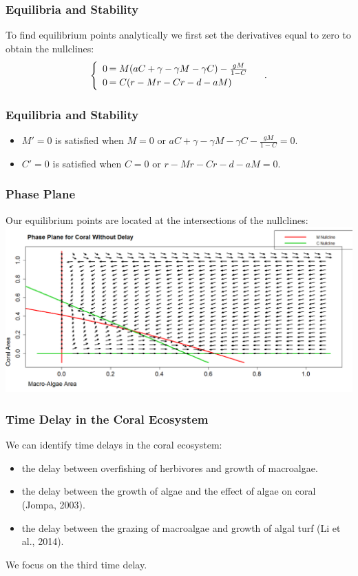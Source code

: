 \documentclass{beamer}
\begin{document}

\begin{frame}\frametitle{Equilibria and Stability}
To find equilibrium points analytically we first set the derivatives equal to zero to obtain the nullclines:
$$\begin{cases}
\begin{array}{rl}
0\hspace{-.8em}&=M(aC + \gamma-\gamma M-\gamma C) - \frac{gM}{1-C}\\
0\hspace{-.8em}&=C(r-Mr-Cr - d - aM)\\
\end{array}
\end{cases}.$$
\end{frame}

\begin{frame}\frametitle{Equilibria and Stability}\begin{itemize}
\item $M'=0$ is satisfied when $M=0$ or $aC + \gamma - \gamma M - \gamma C - \frac{gM}{1-C}=0$.
\item $C'=0$ is satisfied when $C=0$ or $r-Mr-Cr-d-aM=0$.
\end{itemize}
\end{frame}

\begin{frame}\frametitle{Phase Plane} Our equilibrium points are located at the intersections of the nullclines:
\includegraphics[scale=.22]{./nullclines.png}
\end{frame}

\begin{frame}
\frametitle{Time Delay in the Coral Ecosystem}
We can identify time delays in the coral ecosystem:
\begin{itemize}
\item the delay between overfishing of herbivores and growth of macroalgae.\\
\item the delay between the growth of algae and the effect of algae on coral (Jompa, 2003).\\
\item the delay between the grazing of macroalgae and growth of algal turf (Li et al., 2014).
\end{itemize} We focus on the third time delay.
\end{frame}
\end{document}
